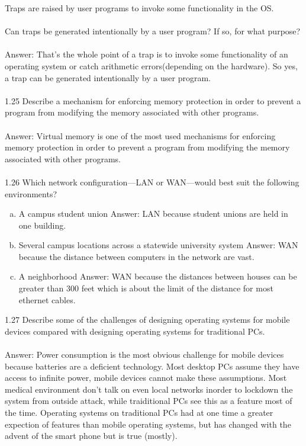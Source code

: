 \documentclass[12pt]{article}
\begin{document}
Traps are raised by user programs to invoke some functionality in the OS.\\\\
Can traps be generated intentionally by a user program? If so, for what 
purpose?\\\\
Answer: That's the whole point of a trap is to invoke some functionality of an 
operating system or catch arithmetic errors(depending on the hardware). 
So yes, a trap can be generated intentionally by a user program.\\\\
1.25 Describe a mechanism for enforcing memory protection in order to
prevent a program from modifying the memory associated with other
programs.\\\\
Answer: Virtual memory is one of the most used mechanisms for enforcing memory 
protection in order to prevent a program from modifying the memory associated 
with other programs. \\\\
1.26 Which network configuration—LAN or WAN—would best suit the
following environments?
\begin{enumerate}[a)]
    \item A campus student union Answer: LAN because student unions are held 
    in one building.
    \item Several campus locations across a statewide university system Answer: 
    WAN because the distance between computers in the network are vast.
    \item A neighborhood Answer: WAN because the distances between houses 
    can be greater than 300 feet which is about the limit of the distance 
    for most ethernet cables.
\end{enumerate}
1.27 Describe some of the challenges of designing operating systems for
mobile devices compared with designing operating systems for traditional
PCs.\\\\
Answer: Power consumption is the most obvious challenge for mobile devices because 
batteries are a deficient technology. Most desktop PCs assume they have 
access to infinite power, mobile devices cannot make these assumptions. 
Most medical environment don't talk on even local networks inorder to 
lockdown the system from outside attack, while traiditional PCs see this
as a feature most of the time. Operating systems on traditional PCs had at 
one time a greater expection of features than mobile operating systems,
but has changed with the advent of the smart phone but is true (mostly).
\end{document}
